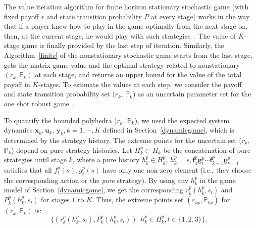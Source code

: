  
%
The value iteration algorithm for finite horizon stationary stochastic game (with fixed payoff $r$ and state transition probability $P$ at every stage) works in the way that if a player knew how to play in the game optimally from the next stage on, then, at the current stage, he would play with such strategies~\cite{plangame}. The value of $K$-stage game is finally provided by the last step of iteration. Similarly, the Algorithm~\ref{finite} of the nonstationary stochastic game starts from the last stage, gets the matrix game value and the optimal strategy related to nonstationary $(r_{k},\mathbb{P}_{k})$  at each stage, and returns an upper bound for the value of the total payoff in $K$-stages. 
To estimate the values %
at each step, we consider the payoff and state transition probability set ($r_{k}$, $\mathbb{P}_{k}$) as an uncertain parameter set for the one shot robust game~\cite{RGT}. %

To quantify the bounded polyhedra ($r_{k}$, $\mathbb{P}_{k}$), we need the expected system dynamics $\mathbf{x}_{k}, \mathbf{u}_{k}$, $\mathbf{y}_{k}, k=1,\cdots,K$ defined in Section~\ref{dynamicgame}, which is determined by the strategy history.  
The extreme points for the uncertain set  ($r_{k}$, $\mathbb{P}_{k}$) depend on pure strategy histories. Let $H^p_k \subset H_k$ be the concatenation of pure strategies until stage $k$, where  a pure history $h^{p}_{k} \in H^{p}_{k}$, $h^{p}_{k}=s_{1}\mathbf{f}^{p}_{1}\mathbf{g}^{p}_{1}\cdots\mathbf{f}^{p}_{k-1}\mathbf{g}^{p}_{k-1}$ satisfies that all $f^{p}_{t}(s), g^{p}_{t}(s)$ have only one non-zero element (i.e., they choose the corresponding action or the \emph{pure} strategy).  
By using any $h^{p}_{k}$ in the game model of Section~\ref{dynamicgame}, we get the corresponding $r^p_k(h^p_k,s_l)$ and $P^p_k(h^p_k,s_l)$ for stages $1$ to $K$. Thus, the extreme points set $(r_{kp},\mathbb{P}_{kp})$ for $(r_{k}, \mathbb{P}_{k})$ is:%
\begin{equation*}
\{(r^{p}_{k}(h^{p}_{k},s_{l}), P^{p}_{k}(h^{p}_{k},s_{l})) |~h^{p}_{k}\in H^{p}_{k},l\in\{1,2,3\}\}.
\end{equation*}



